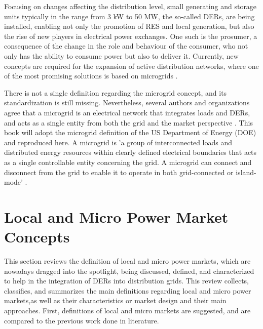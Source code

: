 Focusing on changes affecting the distribution level, small generating and storage units typically in the range from 3 kW to 50 MW, the so-called DERs, are being installed, enabling not only the promotion of RES and local generation, but also the rise of new players in electrical power exchanges. One such is the prosumer, a consequence of the change in the role and behaviour of the consumer, who not only has the ability to consume power but also to deliver it. Currently, new concepts are required for the expansion of active distribution networks, where one of the most promising solutions is based on microgrids \cite{series2009microgrids}.

There is not a single definition regarding the microgrid concept, and its standardization is still missing. Nevertheless, several authors and organizations agree that a microgrid is an electrical network that integrates loads and DERs, and acts as a single entity from both the grid and the market perspective \cite{hatziargyriou2007microgrids, ton2012us}. This book will adopt the microgrid definition of the US Department of Energy (DOE) and reproduced here. A microgrid is 'a group of interconnected loads and distributed energy resources within clearly defined
electrical boundaries that acts as a single controllable entity concerning the grid. A microgrid can connect and disconnect from the grid to enable it to operate in both grid-connected or island-mode' \cite{ton2012us}.

\section{Local and Micro Power Market Concepts}
This section reviews the definition of local and micro power markets, which are nowadays dragged into the spotlight, being discussed, defined, and characterized to help in the integration of DERs into distribution grids. This review collects, classifies, and summarizes the main definitions regarding local and micro power markets,as well as their characteristics or market design and their main approaches. First, definitions of local and micro markets are suggested, and are compared to the previous work done in literature.

